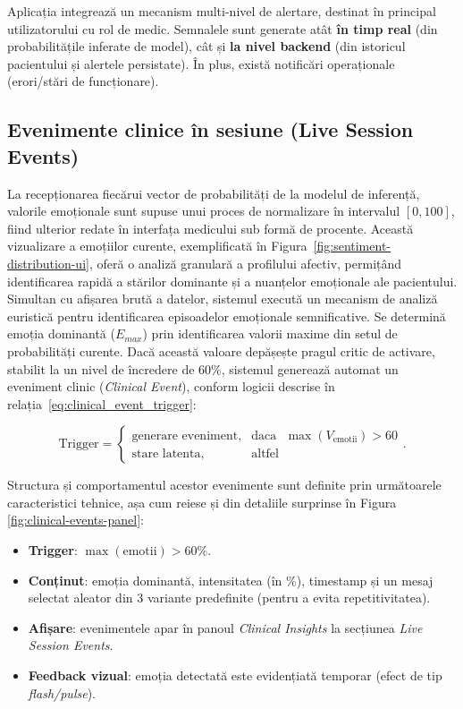 Aplicația integrează un mecanism multi-nivel de alertare, destinat în principal utilizatorului cu rol de medic.
Semnalele sunt generate atât \textbf{în timp real} (din probabilitățile inferate de model), cât și \textbf{la nivel backend}
(din istoricul pacientului și alertele persistate). În plus, există notificări operaționale (erori/stări de funcționare).

\subsection*{Evenimente clinice în sesiune (Live Session Events)}
\label{subsec:live-session-events}

La recepționarea fiecărui vector de probabilități de la modelul de inferență, valorile emoționale sunt supuse unui proces de normalizare în intervalul $[0, 100]$, fiind ulterior redate în interfața medicului sub formă de procente. Această vizualizare a emoțiilor curente, exemplificată în Figura~\ref{fig:sentiment-distribution-ui}, oferă o analiză granulară a profilului afectiv, permițând identificarea rapidă a stărilor dominante și a nuanțelor emoționale ale pacientului. Simultan cu afișarea brută a datelor, sistemul execută un mecanism de analiză euristică pentru identificarea episoadelor emoționale semnificative. Se determină emoția dominantă ($E_{max}$) prin identificarea valorii maxime din setul de probabilități curente. Dacă această valoare depășește pragul critic de activare, stabilit la un nivel de încredere de $60\%$, sistemul generează automat un eveniment clinic (\textit{Clinical Event}), conform logicii descrise în relația~\eqref{eq:clinical_event_trigger}:

\begin{equation}
\text{Trigger} = \begin{cases} 
\text{generare eveniment}, & \text{daca} \text{ } \max(V_{\text{emotii}}) > 60 \\ 
\text{stare latenta}, & \text{altfel} 
\end{cases}.
\label{eq:clinical_event_trigger}
\end{equation}

Structura și comportamentul acestor evenimente sunt definite prin următoarele caracteristici tehnice, așa cum reiese și din detaliile surprinse în Figura \ref{fig:clinical-events-panel}:

\begin{itemize}[noitemsep]
  \item \textbf{Trigger}: $\max(\text{emotii}) > 60\%$.
  \item \textbf{Conținut}: emoția dominantă, intensitatea (în \%), timestamp și un mesaj selectat aleator din 3 variante predefinite (pentru a evita repetitivitatea).
  \item \textbf{Afișare}: evenimentele apar în panoul \textit{Clinical Insights} la secțiunea \textit{Live Session Events}.
  \item \textbf{Feedback vizual}: emoția detectată este evidențiată temporar (efect de tip \textit{flash/\-pulse}).
\end{itemize}

